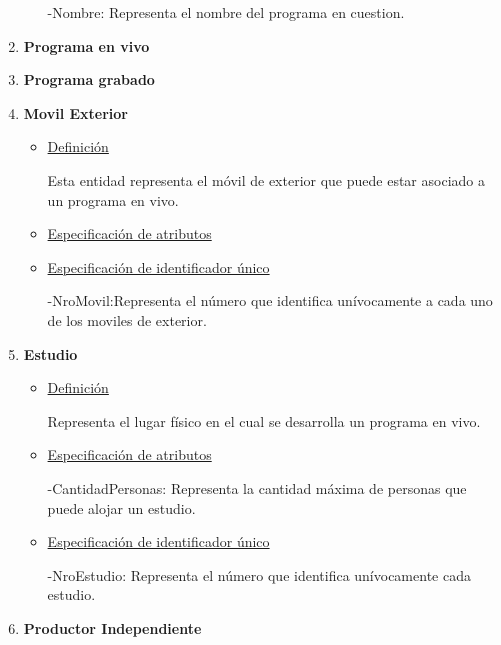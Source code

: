 \documentclass[a4paper,10pt,titlepage]{article}
\begin{document}
\begin{enumerate}
\begin{itemize}
-Nombre: Representa el nombre del programa en cuestion.

\end{itemize}

\item {\bf Programa en vivo}

\item {\bf Programa grabado}

\item {\bf Movil Exterior}

\begin{itemize}
 
\item \underline{Definici\'on}

Esta entidad representa el m\'ovil de exterior que puede estar asociado a un programa en vivo.

\item \underline{Especificaci\'on de atributos}


\item \underline{Especificaci\'on de identificador \'unico}

-NroMovil:Representa el n\'umero que identifica un\'ivocamente a cada uno de los moviles de exterior.

\end{itemize}

\item {\bf Estudio}

\begin{itemize}

\item \underline{Definici\'on}

Representa el lugar f\'isico en el cual se desarrolla un programa en vivo.

\item \underline{Especificaci\'on de atributos}

-CantidadPersonas: Representa la cantidad m\'axima de personas que puede alojar un estudio.

\item \underline{Especificaci\'on de identificador \'unico}

-NroEstudio: Representa el n\'umero que identifica un\'ivocamente cada estudio.

\end{itemize}


\item {\bf Productor Independiente}

\begin{itemize}


\end{itemize}
\end{enumerate}
\end{document}
